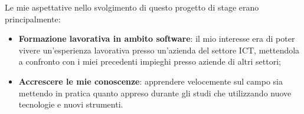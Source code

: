 Le mie aspettative nello svolgimento di questo progetto di stage erano principalmente:
\begin{itemize}
\item \textbf{Formazione lavorativa in ambito software}: il mio interesse era di poter vivere un'esperienza lavorativa presso un'azienda del settore ICT, mettendola a confronto con i miei precedenti impieghi presso aziende di altri settori;
\item \textbf{Accrescere le mie conoscenze}: apprendere velocemente sul campo sia mettendo in pratica quanto appreso durante gli studi che utilizzando nuove tecnologie e nuovi strumenti.
\end{itemize}


